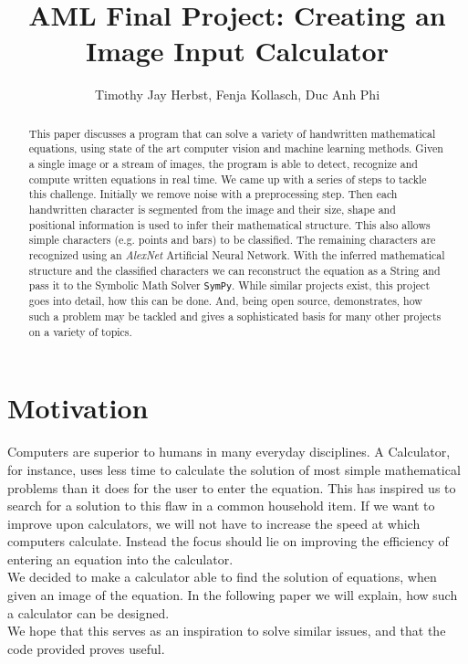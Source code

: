 \documentclass[12pt]{article}
\title{AML Final Project: Creating an Image Input Calculator} %
\author{Timothy Jay Herbst, Fenja Kollasch, Duc Anh Phi}
\begin{document}
\maketitle

\begin{abstract}
	This paper discusses a program that can solve a variety of handwritten mathematical equations, using state of the art computer vision and machine learning methods.
	Given a single image or a stream of images, the program is able to detect, recognize and compute written equations in real time.
	We came up with a series of steps to tackle this challenge.
	Initially we remove noise with a preprocessing step.
	Then each handwritten character is segmented from the image and their size, shape and positional information is used to infer their mathematical structure.
	This also allows simple characters (e.g. points and bars) to be classified.
	The remaining characters are recognized using an \textit{AlexNet} Artificial Neural Network.
	With the inferred mathematical structure and the classified characters we can reconstruct the equation as a String and pass it to the Symbolic Math Solver \texttt{SymPy}.
	While similar projects exist, this project goes into detail, how this can be done.
	And, being open source, demonstrates, how such a problem may be tackled and gives a sophisticated basis for many other projects on a variety of topics.
	
	
	
\end{abstract}
\newpage

\tableofcontents

\newpage
\section{Motivation}

Computers are superior to humans in many everyday disciplines.
A Calculator, for instance, uses less time to calculate the solution of most simple mathematical problems than it does for the user to enter the equation.
This has inspired us to search for a solution to this flaw in a common household item.
If we want to improve upon calculators, we will not have to increase the speed at which computers calculate.
Instead the focus should lie on improving the efficiency of entering an equation into the calculator.\\
We decided to make a calculator able to find the solution of equations, when given an image of the equation.
In the following paper we will explain, how such a calculator can be designed.\\
We hope that this serves as an inspiration to solve similar issues, and that the code provided proves useful.
\end{document}

